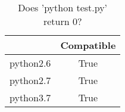 \begin{table}[htp]
	\begin{center}
	\caption{Does 'python test.py' return 0?}
	\label{tab:compatibleTable}
		\begin{tabular}{rc}
		\toprule
			{} & {Compatible}\\
			\midrule
			{python2.6} & True\\
			{python2.7} & True\\
			{python3.7} & True\\
		\bottomrule
		\end{tabular}
	\end{center}
\end{table}